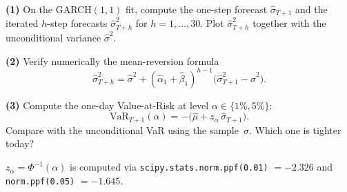 \documentclass[a4paper,11pt]{article}
\begin{document}
\begin{exercise}
\textbf{(1)} On the GARCH$(1, 1)$ fit, compute the one-step
forecast $\widehat\sigma_{T+1}$ and the iterated $h$-step forecasts
$\widehat\sigma_{T+h}^2$ for $h = 1, \dots, 30$. Plot
$\widehat\sigma_{T+h}^2$ together with the unconditional variance
$\widehat\sigma^2$.

\textbf{(2)} Verify numerically the mean-reversion formula
\[
  \widehat\sigma_{T+h}^2
  = \widehat\sigma^2
  + (\widehat\alpha_1 + \widehat\beta_1)^{h-1}
        \bigl(\widehat\sigma_{T+1}^2 - \widehat\sigma^2\bigr).
\]

\textbf{(3)} Compute the one-day Value-at-Risk at level $\alpha
\in \{1\%, 5\%\}$:
\[
  \mathrm{VaR}_{T+1}(\alpha)
  = -\bigl(\widehat\mu + z_\alpha\, \widehat\sigma_{T+1}\bigr).
\]
Compare with the unconditional VaR using the sample~$\sigma$.
Which one is tighter today?
\end{exercise}

\bigskip
\begin{warning}
$z_\alpha = \Phi^{-1}(\alpha)$ is computed via
\texttt{scipy.stats.norm.ppf(0.01)} $= -2.326$ and
\texttt{norm.ppf(0.05)} $= -1.645$.
\end{warning}
\end{document}
